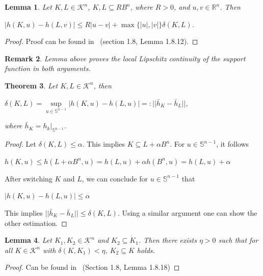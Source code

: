 \documentclass[a4paper]{book}
\newtheorem{theorem}{Theorem}%
\newtheorem{lemma}[theorem]{Lemma}%
\newtheorem{remark}[theorem]{Remark}%
\numberwithin{theorem}{section}%
\begin{document}
\begin{lemma}
    Let $K,L\in\mathscr{K}^{n}$, $K,L\subseteq RB^{n}$, where $R>0$, and $u,v\in\mathbb{R}^{n}$. Then
    \begin{center}
        $|h(K,u)-h(L,v)|\leq R|u-v|+\max\{|u|,|v|\}\delta(K,L)$.
    \end{center}
\end{lemma}
\begin{proof}
    Proof can be found in~\citep{schneider2014convex} (section 1.8, Lemma 1.8.12).
\end{proof}

\begin{remark}
    Lemma above proves the local Lipschitz continuity of the support function in both arguments.
\end{remark}

\begin{theorem}
    Let $K,L\in\mathscr{K}^{n}$, then
    \begin{center}
        $\delta(K,L)=\underset{u\in\mathbb{S}^{n-1}}{\sup}|h(K,u)-h(L,u)|=:||\bar{h}_{K}-\bar{h}_{L}||$,
    \end{center}
    where $\displaystyle \bar{h}_{K}=h_{k}|_{\mathbb{S}^{n-1}}$.
\end{theorem}
\begin{proof}
    Let $\delta(K,L)\leq\alpha$. This implies $K\subseteq L+\alpha B^{n}$. For $u\in\mathbb{S}^{n-1}$, it follows 
    \begin{center}
        $h(K,u)\leq h(L+\alpha B^{n},u)=h(L,u)+\alpha h(B^{n},u)=h(L,u)+\alpha$
    \end{center}
    After switching $K$ and $L$, we can conclude for $u\in\mathbb{S}^{n-1}$ that
    \begin{center}
        $|h(K,u)-h(L,u)|\leq\alpha$
    \end{center}
    This implies $||\bar{h}_{K}-\bar{h}_{L}||\leq\delta(K,L)$. Using a similar argument one can show the other estimation.
\end{proof}

\begin{lemma}
    Let $K_{1},K_{2}\in\mathscr{K}^{n}$ and $K_{2}\subseteq\mathring{K}_{1}$. Then there exists $\eta>0$ such that for all $K\in\mathscr{K}^{n}$ with $\delta(K,K_{1})<\eta$, $K_{2}\subseteq K$ holds.
\end{lemma}
\begin{proof}
    Can be found in~\citep{schneider2014convex} (Section 1.8, Lemma 1.8.18)
\end{proof}
\end{document}
